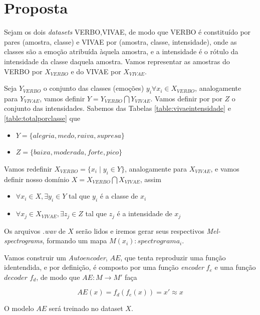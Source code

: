 \section{Proposta}

Sejam os dois \textit{datasets} VERBO,VIVAE, de modo que VERBO é constituído por pares (amostra, classe) e VIVAE por (amostra, classe, intensidade), onde as classes são a emoção atribuída àquela amostra, e a intensidade é o rótulo da intensidade da classe daquela amostra. Vamos representar as amostras do VERBO por $X_{VERBO}$ e do VIVAE por $X_{VIVAE}$.

Seja $Y_{VERBO}$ o conjunto das classes (emoções) $y_i \forall x_i \in X_{VERBO}$, analogamente para $Y_{VIVAE}$, vamos definir $Y = Y_{VERBO} \bigcap Y_{VIVAE}$. Vamos definir por por $Z$ o conjunto das intensidades. Sabemos das Tabelas \ref{table:vivaeintensidade} e \ref{table:totalporclasse} que

\begin{itemize}
    \item $Y = \{alegria, medo, raiva, supresa\}$
    \item $Z = \{baixa, moderada, forte, pico\}$
\end{itemize}

Vamos redefinir $X_{VERBO} = \{x_i \mid y_i \in Y\}$, analogamente para $X_{VIVAE}$, e vamos definir nosso domínio $X = X_{VERBO} \bigcap X_{VIVAE}$, assim

\begin{itemize}
    \item $\forall x_i \in X, \exists y_i \in Y$ tal que  $y_i$ é a classe de $x_i$
    \item $\forall x_j \in X_{VIVAE}, \exists z_j \in Z$ tal que  $z_j$ é a intensidade de $x_j$
\end{itemize}

Os arquivos \textit{.wav} de $X$ serão lidos e iremos gerar seus respectivos \textit{Mel-spectrograms}, formando um mapa $M(x_i): spectrograma_i$.

Vamos construir um \textit{Autoencoder}, $AE$, que tenta reproduzir uma função identendida, e por definição, é composto por uma função \textit{encoder} $f_e$ e uma função $decoder$ $f_d$, de modo que $AE: M \rightarrow M'$ faça

\begin{equation}
    AE(x) = f_d(f_e(x)) = x' \approx x
\end{equation}

O modelo $AE$ será treinado no dataset $X$.

